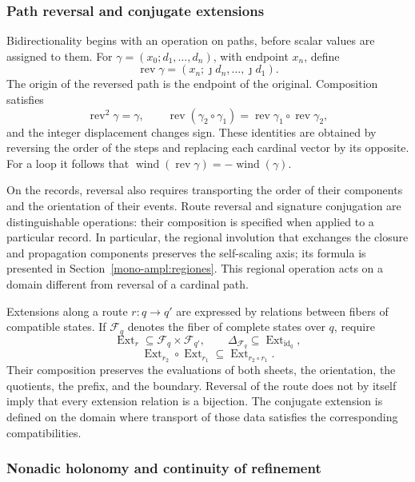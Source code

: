 \subsubsection{Path reversal and conjugate extensions}
\label{tpk-int:bidireccionalidad}

Bidirectionality begins with an operation on paths, before
scalar values are assigned to them. For
\(\gamma=(x_0;d_1,\ldots,d_n)\), with endpoint \(x_n\), define
\[
 \operatorname{rev}\gamma
   =(x_n;\jmath d_n,\ldots,\jmath d_1).
\]
The origin of the reversed path is the endpoint of the original.
Composition satisfies
\[
 \operatorname{rev}^2\gamma=\gamma,\qquad
 \operatorname{rev}(\gamma_2\circ\gamma_1)
   =\operatorname{rev}\gamma_1\circ\operatorname{rev}\gamma_2,
\]
and the integer displacement changes sign. These identities are obtained
by reversing the order of the steps and replacing each cardinal vector by
its opposite. For a loop it follows that
\(\operatorname{wind}(\operatorname{rev}\gamma)
=-\operatorname{wind}(\gamma)\).

On the records, reversal also requires transporting the order
of their components and the orientation of their events. Route reversal
and signature conjugation are distinguishable operations: their
composition is specified when applied to a particular record. In
particular, the regional involution that exchanges the closure and
propagation components preserves the self-scaling axis; its formula is
presented in Section~\ref{mono-ampl:regiones}. This regional operation
acts on a domain different from reversal of a cardinal path.

Extensions along a route \(r:q\to q'\) are expressed by
relations between fibers of compatible states. If \(\mathcal F_q\)
denotes the fiber of complete states over \(q\), require
\[
 \operatorname{Ext}_r\subseteq\mathcal F_q\times\mathcal F_{q'},
 \qquad \Delta_{\mathcal F_q}\subseteq
        \operatorname{Ext}_{\operatorname{id}_q},
\]
\[
 \operatorname{Ext}_{r_2}\circ\operatorname{Ext}_{r_1}
       \subseteq\operatorname{Ext}_{r_2\circ r_1}.
\]
Their composition preserves the evaluations of both sheets, the orientation,
the quotients, the prefix, and the boundary. Reversal of the route does not
by itself imply that every extension relation is a bijection.
The conjugate extension is defined on the domain where transport of
those data satisfies the corresponding compatibilities.

\subsubsection{Nonadic holonomy and continuity of refinement}
\label{tpk-int:holonomia}


